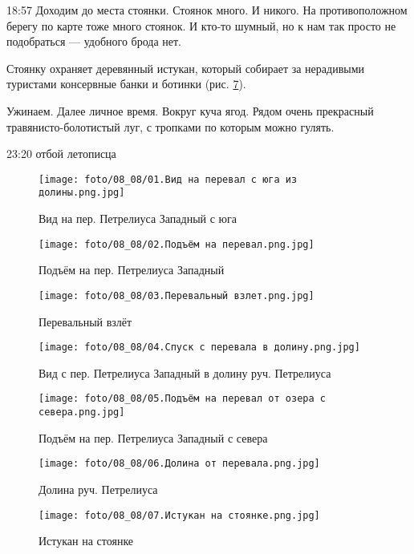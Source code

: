 18:57 Доходим до места стоянки. Стоянок много. И никого.
На противоположном берегу по карте тоже много стоянок. И кто-то шумный, но к нам так просто не подобраться --- удобного брода нет.

Стоянку охраняет деревянный истукан, который собирает за нерадивыми туристами консервные банки и ботинки (рис. \ref{fig4:7}).

Ужинаем. Далее личное время.
Вокруг куча ягод. Рядом очень прекрасный травянисто-болотистый луг, с тропками по которым можно гулять.

23:20 отбой летописца

\begin{figure}
    \centering
    \texttt{[image: foto/08\_08/01.Вид на перевал с юга из долины.png.jpg]}
    \caption{Вид на пер. Петрелиуса Западный с юга}
    \label{fig4:1}
\end{figure}

\begin{figure}
    \centering
    \texttt{[image: foto/08\_08/02.Подъём на перевал.png.jpg]}
    \caption{Подъём на пер. Петрелиуса Западный}
    \label{fig4:2}
\end{figure}

\begin{figure}
    \centering
    \texttt{[image: foto/08\_08/03.Перевальный взлет.png.jpg]}
    \caption{Перевальный взлёт}
    \label{fig4:3}
\end{figure}

\begin{figure}
    \centering
    \texttt{[image: foto/08\_08/04.Спуск с перевала в долину.png.jpg]}
    \caption{Вид с пер. Петрелиуса Западный в долину руч. Петрелиуса}
    \label{fig4:4}
\end{figure}

\begin{figure}
    \centering
    \texttt{[image: foto/08\_08/05.Подъём на перевал от озера с севера.png.jpg]}
    \caption{Подъём на пер. Петрелиуса Западный с севера}
    \label{fig4:5}
\end{figure}

\begin{figure}
    \centering
    \texttt{[image: foto/08\_08/06.Долина от перевала.png.jpg]}
    \caption{Долина руч. Петрелиуса}
    \label{fig4:6}
\end{figure}

\begin{figure}
    \centering
    \texttt{[image: foto/08\_08/07.Истукан на стоянке.png.jpg]}
    \caption{Истукан на стоянке}
    \label{fig4:7}
\end{figure}

